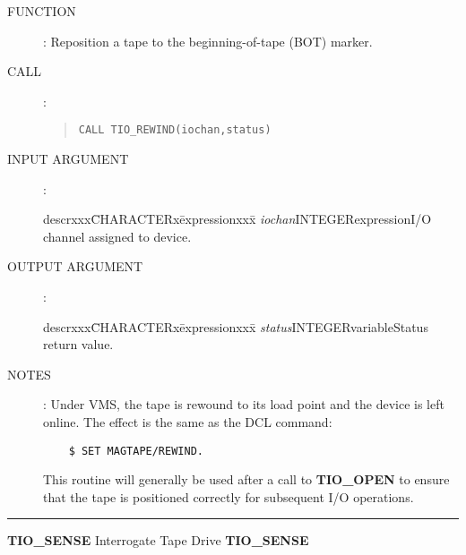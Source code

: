 \begin{description}
\item [FUNCTION]:
Reposition a tape to the beginning-of-tape (BOT) marker.
\item [CALL]:
\begin{quote}
{\tt CALL TIO\_REWIND(iochan,status)}
\end{quote}
\item [INPUT ARGUMENT]:
\begin{tabbing}
descrxxx\=CHARACTERx\=expressionxxx\=\kill
{\em iochan}\>INTEGER\>expression\>I/O channel assigned to device.
\end{tabbing}
\item [OUTPUT ARGUMENT]:
\begin{tabbing}
descrxxx\=CHARACTERx\=expressionxxx\=\kill
{\em status}\>INTEGER\>variable\>Status return value.
\end{tabbing}
\item [NOTES]:
Under VMS, the tape is rewound to its load point and the device is left online.
The effect is the same as the DCL command:
\begin{verbatim}
    $ SET MAGTAPE/REWIND.
\end{verbatim}
This routine will generally be used after a call to {\bf TIO\_OPEN} to ensure
that the tape is positioned correctly for subsequent I/O operations.
\end{description}
\goodbreak
\rule{\textwidth}{0.3mm}
{\Large {\bf TIO\_SENSE} \hfill  Interrogate Tape Drive \hfill {\bf TIO\_SENSE}}
